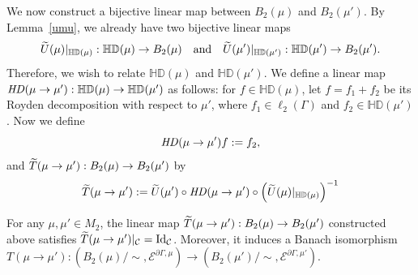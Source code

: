 \documentclass[AHL,Unicode,longabstracts,published]{cedram}
\newcommand{\ce}{\mathcal{E}}
\newcommand{\cC}{\mathcal{C}}
\newcommand{\bHD}{\mathbb{HD}}
\newcommand{\rmId}{\mathrm{Id}}
\let\oldtilde\tilde
\renewcommand*{\tilde}[1]{\mathchoice{\widetilde{#1}}{\widetilde{#1}}{\oldtilde{#1}}{\oldtilde{#1}}}
\begin{document}
We now construct a bijective linear map between $B_2(\mu)$ and $B_2(\mu')$. By Lemma~\ref{umu}, we already have two bijective linear maps 
\[
\tilde{U}(\mu)|_{\bHD(\mu)}:\bHD(\mu)\to B_2(\mu)\quad \text{and}\quad \tilde{U}(\mu')|_{\bHD(\mu')}:\bHD(\mu')\to B_2(\mu').
\]
Therefore, we wish to relate $\bHD(\mu)$ and $\bHD(\mu')$. We define a linear map ${\it HD}(\mu\rightarrow\mu'):\bHD(\mu)\rightarrow\bHD(\mu')$ as follows: for $f\in\bHD(\mu)$, let $f=f_1+f_2$ be its Royden decomposition with respect to $\mu'$, where $f_1\in\ell_2(\Gamma)$
and $f_2\in\bHD(\mu')$. Now we define
\[
{\it HD}(\mu\rightarrow\mu')f:=f_2,
\]
and $\tilde{T}(\mu\rightarrow\mu'): B_2(\mu)\to B_2(\mu')$ by
\begin{align}\label{def:tmumu}
\tilde{T}(\mu\rightarrow\mu'):=\tilde{U}(\mu')
\circ {\it HD}(\mu\rightarrow\mu')\circ \left(\tilde{U}(\mu)|_{\bHD(\mu)}\right)^{-1}
\end{align}

\begin{prop}\label{mumu}
For any $\mu,\mu'\in M_2$, the linear map $\tilde{T}(\mu\rightarrow\mu'): B_2(\mu)\to B_2(\mu')$ constructed above satisfies $\tilde{T}(\mu\to\mu')|_\cC=\rmId_\cC$. Moreover, it induces a Banach isomorphism $T(\mu\rightarrow\mu'):(B_2(\mu)/\sim,\ce^{\partial\Gamma,\mu})\rightarrow(B_2(\mu')/\sim,\ce^{\partial\Gamma,\mu'})$.
\end{prop}
\end{document}
